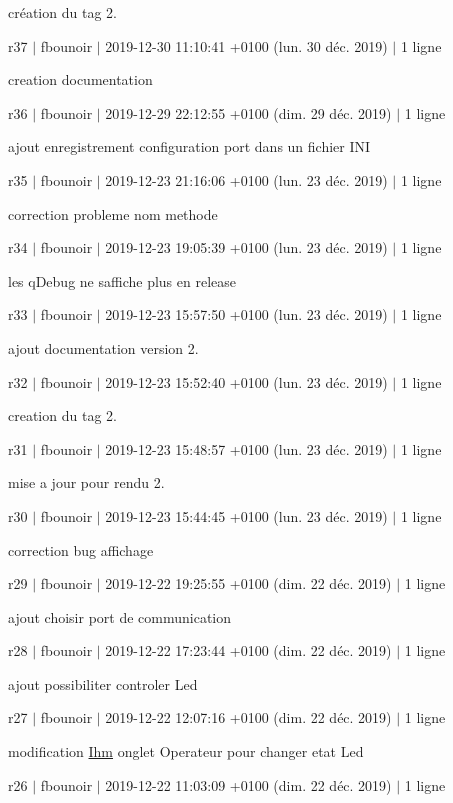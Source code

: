création du tag 2.

r37 $\vert$ fbounoir $\vert$ 2019-\/12-\/30 11\+:10\+:41 +0100 (lun. 30 déc. 2019) $\vert$ 1 ligne

creation documentation

r36 $\vert$ fbounoir $\vert$ 2019-\/12-\/29 22\+:12\+:55 +0100 (dim. 29 déc. 2019) $\vert$ 1 ligne

ajout enregistrement configuration port dans un fichier I\+NI

r35 $\vert$ fbounoir $\vert$ 2019-\/12-\/23 21\+:16\+:06 +0100 (lun. 23 déc. 2019) $\vert$ 1 ligne

correction probleme nom methode

r34 $\vert$ fbounoir $\vert$ 2019-\/12-\/23 19\+:05\+:39 +0100 (lun. 23 déc. 2019) $\vert$ 1 ligne

les q\+Debug ne s\textquotesingle{}affiche plus en release

r33 $\vert$ fbounoir $\vert$ 2019-\/12-\/23 15\+:57\+:50 +0100 (lun. 23 déc. 2019) $\vert$ 1 ligne

ajout documentation version 2.

r32 $\vert$ fbounoir $\vert$ 2019-\/12-\/23 15\+:52\+:40 +0100 (lun. 23 déc. 2019) $\vert$ 1 ligne

creation du tag 2.

r31 $\vert$ fbounoir $\vert$ 2019-\/12-\/23 15\+:48\+:57 +0100 (lun. 23 déc. 2019) $\vert$ 1 ligne

mise a jour pour rendu 2.

r30 $\vert$ fbounoir $\vert$ 2019-\/12-\/23 15\+:44\+:45 +0100 (lun. 23 déc. 2019) $\vert$ 1 ligne

correction bug affichage

r29 $\vert$ fbounoir $\vert$ 2019-\/12-\/22 19\+:25\+:55 +0100 (dim. 22 déc. 2019) $\vert$ 1 ligne

ajout choisir port de communication

r28 $\vert$ fbounoir $\vert$ 2019-\/12-\/22 17\+:23\+:44 +0100 (dim. 22 déc. 2019) $\vert$ 1 ligne

ajout possibiliter controler Led

r27 $\vert$ fbounoir $\vert$ 2019-\/12-\/22 12\+:07\+:16 +0100 (dim. 22 déc. 2019) $\vert$ 1 ligne

modification \hyperlink{class_ihm}{Ihm} onglet Operateur pour changer etat Led

r26 $\vert$ fbounoir $\vert$ 2019-\/12-\/22 11\+:03\+:09 +0100 (dim. 22 déc. 2019) $\vert$ 1 ligne

